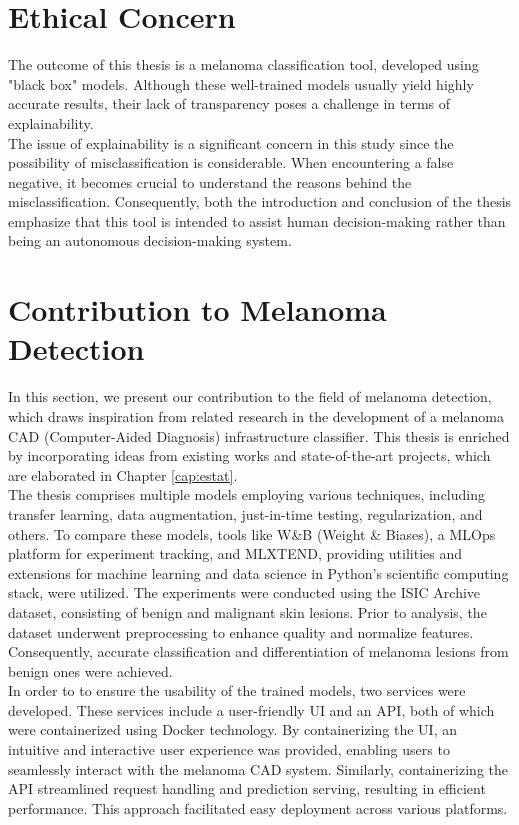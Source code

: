 \section{Ethical Concern}

The outcome of this thesis is a melanoma classification tool, developed using
"black box" models. Although these well-trained models usually yield highly
accurate results, their lack of transparency poses a challenge in terms of
explainability. \\

The issue of explainability is a significant concern in this study since the
possibility of misclassification is considerable. When encountering a false
negative, it becomes crucial to understand the reasons behind the
misclassification. Consequently, both the introduction and conclusion of the
thesis emphasize that this tool is intended to assist human decision-making
rather than being an autonomous decision-making system.

\section{Contribution to Melanoma Detection}

In this section, we present our contribution to the field of melanoma
detection, which draws inspiration from related research in the development of
a melanoma CAD (Computer-Aided Diagnosis) infrastructure classifier. This
thesis is enriched by incorporating ideas from existing works and
state-of-the-art projects, which are elaborated in Chapter \ref{cap:estat}. \\

The thesis comprises multiple models employing various techniques, including
transfer learning, data augmentation, just-in-time testing, regularization, and
others. To compare these models, tools like W\&B (Weight \& Biases), a MLOps
platform for experiment tracking, and MLXTEND, providing utilities and
extensions for machine learning and data science in Python's scientific
computing stack, were utilized. The experiments were conducted using the ISIC
Archive dataset, consisting of benign and malignant skin lesions. Prior to
analysis, the dataset underwent preprocessing to enhance quality and normalize
features. Consequently, accurate classification and differentiation of melanoma
lesions from benign ones were achieved. \\

In order to to ensure the usability of the trained models,
two services were developed. These services include a user-friendly UI and an
API, both of which were containerized using Docker technology. By
containerizing the UI, an intuitive and interactive user experience was
provided, enabling users to seamlessly interact with the melanoma CAD system.
Similarly, containerizing the API streamlined request handling and prediction
serving, resulting in efficient performance. This approach facilitated easy
deployment across various platforms.
